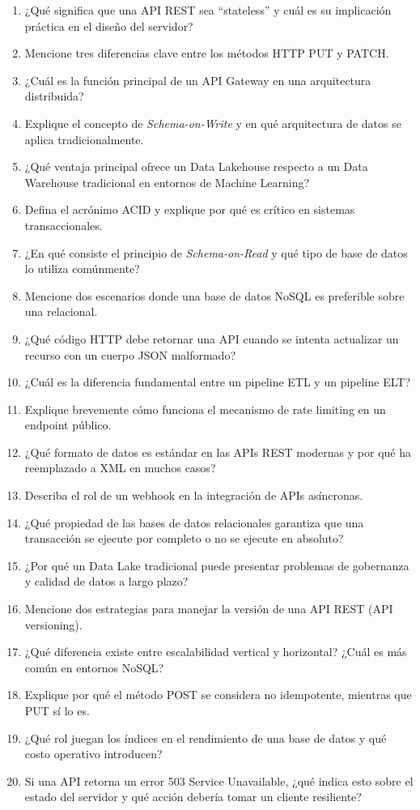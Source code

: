 \documentclass[12pt,a4paper]{article}
\begin{document}
\begin{enumerate}[label=\arabic*.]
    \item ¿Qué significa que una API REST sea ``stateless'' y cuál es su implicación práctica en el diseño del servidor?
    \item Mencione tres diferencias clave entre los métodos HTTP PUT y PATCH.
    \item ¿Cuál es la función principal de un API Gateway en una arquitectura distribuida?
    \item Explique el concepto de \textit{Schema-on-Write} y en qué arquitectura de datos se aplica tradicionalmente.
    \item ¿Qué ventaja principal ofrece un Data Lakehouse respecto a un Data Warehouse tradicional en entornos de Machine Learning?
    \item Defina el acrónimo ACID y explique por qué es crítico en sistemas transaccionales.
    \item ¿En qué consiste el principio de \textit{Schema-on-Read} y qué tipo de base de datos lo utiliza comúnmente?
    \item Mencione dos escenarios donde una base de datos NoSQL es preferible sobre una relacional.
    \item ¿Qué código HTTP debe retornar una API cuando se intenta actualizar un recurso con un cuerpo JSON malformado?
    \item ¿Cuál es la diferencia fundamental entre un pipeline ETL y un pipeline ELT?
    \item Explique brevemente cómo funciona el mecanismo de rate limiting en un endpoint público.
    \item ¿Qué formato de datos es estándar en las APIs REST modernas y por qué ha reemplazado a XML en muchos casos?
    \item Describa el rol de un webhook en la integración de APIs asíncronas.
    \item ¿Qué propiedad de las bases de datos relacionales garantiza que una transacción se ejecute por completo o no se ejecute en absoluto?
    \item ¿Por qué un Data Lake tradicional puede presentar problemas de gobernanza y calidad de datos a largo plazo?
    \item Mencione dos estrategias para manejar la versión de una API REST (API versioning).
    \item ¿Qué diferencia existe entre escalabilidad vertical y horizontal? ¿Cuál es más común en entornos NoSQL?
    \item Explique por qué el método POST se considera no idempotente, mientras que PUT sí lo es.
    \item ¿Qué rol juegan los índices en el rendimiento de una base de datos y qué costo operativo introducen?
    \item Si una API retorna un error 503 Service Unavailable, ¿qué indica esto sobre el estado del servidor y qué acción debería tomar un cliente resiliente?
\end{enumerate}
\end{document}
